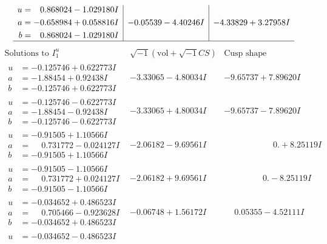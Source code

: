 \documentclass[1p]{elsarticle_modified}
\theoremstyle{definition}
\newcommand{\I}{\sqrt{-1}}
\begin{document}
$$\begin{array}{c|c|c}
\begin{aligned}
u &= \phantom{-}0.868024 - 1.029180 I \\
a &= -0.658984 + 0.058816 I \\
b &= \phantom{-}0.868024 - 1.029180 I\end{aligned}
 & -0.05539 - 4.40246 I & -4.33829 + 3.27958 I\\
 \hline 
 \end{array}$$\newpage$$\begin{array}{c|c|c}  
\text{Solutions to }I^u_{1}& \I (\text{vol} + \sqrt{-1}CS) & \text{Cusp shape}\\
 \hline 
\begin{aligned}
u &= -0.125746 + 0.622773 I \\
a &= -1.88454 + 0.92438 I \\
b &= -0.125746 + 0.622773 I\end{aligned}
 & -3.33065 - 4.80034 I & -9.65737 + 7.89620 I \\ \hline\begin{aligned}
u &= -0.125746 - 0.622773 I \\
a &= -1.88454 - 0.92438 I \\
b &= -0.125746 - 0.622773 I\end{aligned}
 & -3.33065 + 4.80034 I & -9.65737 - 7.89620 I \\ \hline\begin{aligned}
u &= -0.91505 + 1.10566 I \\
a &= \phantom{-}0.731772 - 0.024127 I \\
b &= -0.91505 + 1.10566 I\end{aligned}
 & -2.06182 - 9.69561 I & \phantom{-0.000000 -}0. + 8.25119 I \\ \hline\begin{aligned}
u &= -0.91505 - 1.10566 I \\
a &= \phantom{-}0.731772 + 0.024127 I \\
b &= -0.91505 - 1.10566 I\end{aligned}
 & -2.06182 + 9.69561 I & \phantom{-0.000000 } 0. - 8.25119 I \\ \hline\begin{aligned}
u &= -0.034652 + 0.486523 I \\
a &= \phantom{-}0.705466 - 0.923628 I \\
b &= -0.034652 + 0.486523 I\end{aligned}
 & -0.06748 + 1.56172 I & \phantom{-}0.05355 - 4.52111 I \\ \hline\begin{aligned}
u &= -0.034652 - 0.486523 I \\

\end{aligned}
\end{array}$$
\end{document}
